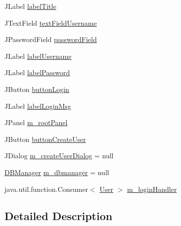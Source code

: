 \begin{DoxyCompactItemize}
\item 
J\+Label \mbox{\hyperlink{classcom_1_1activitytracker_1_1_login_window_a3c4c84a656351094b34320a5c352e685}{label\+Title}}
\item 
J\+Text\+Field \mbox{\hyperlink{classcom_1_1activitytracker_1_1_login_window_aba181dcec114c349a67304406bcce92a}{text\+Field\+Username}}
\item 
J\+Password\+Field \mbox{\hyperlink{classcom_1_1activitytracker_1_1_login_window_ae53353ceea197fe7b93f1b7156112d08}{password\+Field}}
\item 
J\+Label \mbox{\hyperlink{classcom_1_1activitytracker_1_1_login_window_a4999e1461716e42ee4e3de8e3eb47eb9}{label\+Username}}
\item 
J\+Label \mbox{\hyperlink{classcom_1_1activitytracker_1_1_login_window_a8be41422fca8038bd8c2ba49af8ae6ce}{label\+Password}}
\item 
J\+Button \mbox{\hyperlink{classcom_1_1activitytracker_1_1_login_window_ac77d9f8f3a6c697a9847ecd130ac2ef6}{button\+Login}}
\item 
J\+Label \mbox{\hyperlink{classcom_1_1activitytracker_1_1_login_window_a567ae49b39c07840b39eec92fdf92c22}{label\+Login\+Msg}}
\item 
J\+Panel \mbox{\hyperlink{classcom_1_1activitytracker_1_1_login_window_aa62049382baddb801cb25201814efc57}{m\+\_\+root\+Panel}}
\item 
J\+Button \mbox{\hyperlink{classcom_1_1activitytracker_1_1_login_window_a1ff77d6846d01d4a8540371ede091371}{button\+Create\+User}}
\item 
J\+Dialog \mbox{\hyperlink{classcom_1_1activitytracker_1_1_login_window_a49ff7093e29ce7bd22c42ac8099d5d34}{m\+\_\+create\+User\+Dialog}} = null
\item 
\mbox{\hyperlink{classcom_1_1activitytracker_1_1_d_b_manager}{D\+B\+Manager}} \mbox{\hyperlink{classcom_1_1activitytracker_1_1_login_window_a1d278c8158f803151737943e9ea2a9bf}{m\+\_\+dbmanager}} = null
\item 
java.\+util.\+function.\+Consumer$<$ \mbox{\hyperlink{classcom_1_1activitytracker_1_1_user}{User}} $>$ \mbox{\hyperlink{classcom_1_1activitytracker_1_1_login_window_a9b7d3aa9c6a7cf67e78606c24e21109c}{m\+\_\+login\+Handler}}
\end{DoxyCompactItemize}


\subsection{Detailed Description}


